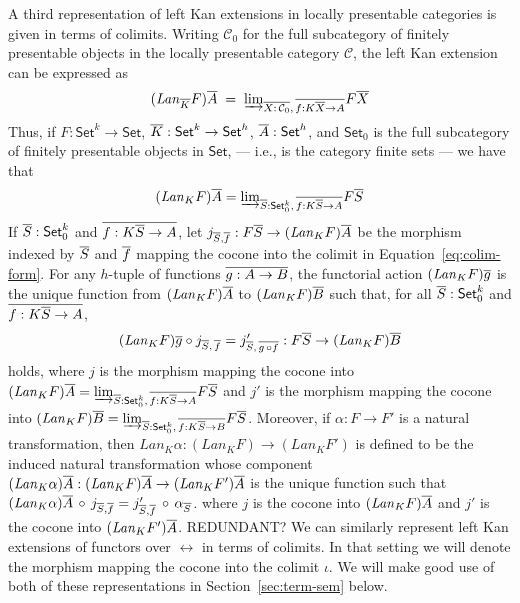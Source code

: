\documentclass{lmcs}
\theoremstyle{plain}\newtheorem{satz}[thm]{Satz}
\newcommand{\set}{\mathsf{Set}}
\begin{document}
A third representation of left Kan extensions in locally presentable
categories is given in terms of colimits. Writing ${\mathcal C}_0$ for
the full subcategory of finitely presentable objects in the locally
presentable category $\mathcal C$, the left Kan extension can be
expressed as
\[
(\mathit{Lan}_{\overline{K}} F)\overline{A} \;=\; {{\underrightarrow{\lim}}_{\overline{X : \,{\mathcal
        C}_0},\, \overline{f : K{\overline{X}} \to A}}{F \overline{X}}}\]
Thus, if $F : \set^k \to \set$, $\ol{K} :
  \set^k \to \set^h$, $\ol{A} : \set^h$, and $\set_0$ is the full
  subcategory of finitely presentable objects in $\set$, --- i.e., is
  the category finite sets --- we  have that
\begin{equation}\label{eq:colim-form}
(\mathit{Lan}_K F) \ol{A} = \colim{\ol{S} : \set_0^k, \,\ol{f :
      K\ol{S} \to  A}}{F \ol{S}}
\end{equation}
If $\ol{S} : \set_0^k$ and $\overline{f : K\overline{S} \to A}$, let $j_{\overline{S},
  \overline{f}} : F \overline{S} \to (\mathit{Lan}_KF) \overline{A}$ be the morphism
indexed by $\overline{S}$ and $\overline{f}$ mapping the cocone into the colimit
in Equation~\ref{eq:colim-form}.
For any $h$-tuple of functions
$\overline{g : A \to B}$, the functorial action $(\mathit{Lan}_K F) \overline{g}$
is the unique function from $(\mathit{Lan}_K F) \overline{A}$ to
$(\mathit{Lan}_K F) \overline{B}$ such that, for all $\ol{S} : \set^k_0$ and
$\overline{f : K\overline{S} \to A}$,\,
\begin{equation}\label{eq:cocone-def}
(\mathit{Lan}_KF) \overline{g} \circ j_{\overline{S},\, \overline{f}}
= j'_{\overline{S},\, \overline{g\, \circ f}}
: F \overline{S} \to (\mathit{Lan}_KF) \overline{B}
\end{equation}
holds, where $j$ is the morphism mapping the cocone into
$(\mathit{Lan}_K F) \ol{A} = \colim{\ol{S} : \set_0^k, \,\ol{f :
    K\ol{S} \to A}}{F \ol{S}}$ and $j'$ is the morphism mapping the
cocone into $(\mathit{Lan}_K F) \ol{B} = \colim{\ol{S} : \set_0^k,
  \,\ol{f : K\ol{S} \to B}}{F \ol{S}}$.  Moreover, if $\alpha : F \to
F'$ is a natural transformation, then $\mathit{Lan}_K \alpha :
(\mathit{Lan}_K F) \to (\mathit{Lan}_K F')$ is defined to be the
induced natural transformation whose component $(\mathit{Lan}_K
\alpha) \overline{A} : (\mathit{Lan}_K F) \overline{A} \to (\mathit{Lan}_K F')
\overline{A}$ is the unique function such that $(\mathit{Lan}_K \alpha)
\overline{A} \,\circ\, j_{\overline{S}, \overline{f}} = j'_{\overline{S}, \overline{f}} \,\circ\,
\alpha_{\overline{S}}$. {\color{red} where $j$ is the cocone into
  $(\mathit{Lan}_K F) \overline{A}$ and $j'$ is the cocone into
  $(\mathit{Lan}_K F') \overline{A}$. REDUNDANT?} We can similarly
represent left Kan extensions of functors over $\rel$ in terms of
colimits. In that setting we will denote the morphism mapping the
cocone into the colimit $\iota$. We will make good use of both of
these representations in Section~\ref{sec:term-sem} below.
\end{document}
